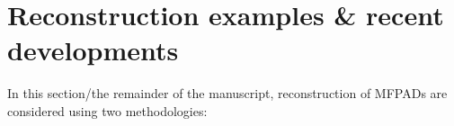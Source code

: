 \section{Reconstruction examples & recent developments}

In this section/the remainder of the manuscript, reconstruction of MFPADs are considered using two methodologies:

